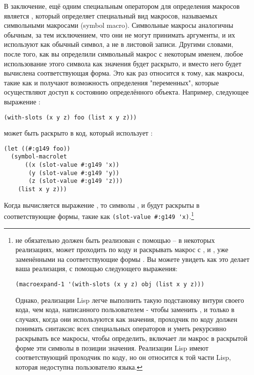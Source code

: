 В заключение, ещё одним специальным оператором для определения макросов является
, который определяет специальный вид макросов, называемых
символьными макросами (symbol macro).  Символьные макросы аналогичны обычным, за тем
исключением, что они не могут принимать аргументы, и их используют как обычный символ, а
не в листовой записи.  Другими словами, после того, как вы определили символьный макрос с
некоторым именем, любое использование этого символа как значения будет раскрыто, и вместо
него будет вычислена соответствующая форма.  Это как раз относится к тому, как макросы,
такие как  и  получают возможность определения
"переменных", которые осуществляют доступ к состоянию определённого объекта.  Например,
следующее выражение :

\begin{lstlisting}
(with-slots (x y z) foo (list x y z)))
\end{lstlisting}

может быть раскрыто в код, который использует :

\begin{lstlisting}
(let ((#:g149 foo))
  (symbol-macrolet
      ((x (slot-value #:g149 'x))
       (y (slot-value #:g149 'y))
       (z (slot-value #:g149 'z)))
    (list x y z)))
\end{lstlisting}

Когда вычисляется выражение , то символы ,  и 
будут раскрыты в соответствующие формы, такие как \lstinline!(slot-value #:g149 'x)!.\footnote{ не обязательно должен быть реализован с помощью
   -- в некоторых реализациях,  может проходить по
  коду и раскрывать макрос с ,  и , уже заменёнными на
  соответствующие формы .  Вы можете увидеть как это делает ваша
  реализация, с помощью следующего выражения:

\begin{lstlisting}
(macroexpand-1 '(with-slots (x y z) obj (list x y z)))
\end{lstlisting}

Однако, реализации Lisp легче выполнить такую подстановку внтури своего кода, чем кода,
написанного пользователем - чтобы заменить ,  и  только в случаях,
когда они используются как значения, проходчик по коду должен понимать синтаксис всех
специальных операторов и уметь рекурсивно раскрывать все макросы, чтобы определить,
включает ли макрос в раскрытой форме эти символы в позиции значения.  Реализации Lisp
имеют соответствующий проходчик по коду, но он относится к той части Lisp, которая
недоступна пользователю языка.}

